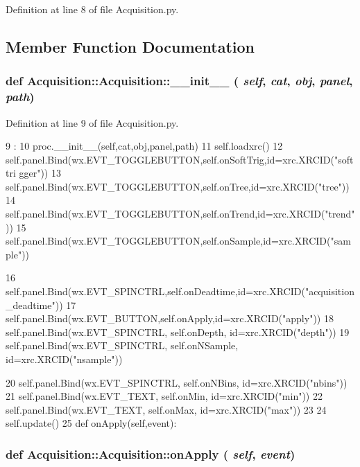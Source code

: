 Definition at line 8 of file Acquisition.py.

\subsection{Member Function Documentation}
\hypertarget{classAcquisition_1_1Acquisition_a01a30848ca3a0dd4e0e0d137b6c2b514}{
\subsubsection[{\_\-\_\-init\_\-\_\-}]{\setlength{\rightskip}{0pt plus 5cm}def Acquisition::Acquisition::\_\-\_\-init\_\-\_\- ( {\em self}, \/   {\em cat}, \/   {\em obj}, \/   {\em panel}, \/   {\em path})}}
\label{classAcquisition_1_1Acquisition_a01a30848ca3a0dd4e0e0d137b6c2b514}


Definition at line 9 of file Acquisition.py.


\begin{DoxyCode}
9                                              :
10         proc.__init__(self,cat,obj,panel,path)
11         self.loadxrc()
12         self.panel.Bind(wx.EVT_TOGGLEBUTTON,self.onSoftTrig,id=xrc.XRCID("softtri
      gger"))
13         self.panel.Bind(wx.EVT_TOGGLEBUTTON,self.onTree,id=xrc.XRCID("tree"))
14         self.panel.Bind(wx.EVT_TOGGLEBUTTON,self.onTrend,id=xrc.XRCID("trend"))
15         self.panel.Bind(wx.EVT_TOGGLEBUTTON,self.onSample,id=xrc.XRCID("sample"))
      
16         self.panel.Bind(wx.EVT_SPINCTRL,self.onDeadtime,id=xrc.XRCID("acquisition
      _deadtime"))
17         self.panel.Bind(wx.EVT_BUTTON,self.onApply,id=xrc.XRCID("apply"))
18         self.panel.Bind(wx.EVT_SPINCTRL, self.onDepth, id=xrc.XRCID("depth"))
19         self.panel.Bind(wx.EVT_SPINCTRL, self.onNSample, id=xrc.XRCID("nsample"))
      
20         self.panel.Bind(wx.EVT_SPINCTRL, self.onNBins, id=xrc.XRCID("nbins"))
21         self.panel.Bind(wx.EVT_TEXT, self.onMin, id=xrc.XRCID("min"))
22         self.panel.Bind(wx.EVT_TEXT, self.onMax, id=xrc.XRCID("max"))
23 
24         self.update()
25 
    def onApply(self,event):
\end{DoxyCode}
\hypertarget{classAcquisition_1_1Acquisition_a25a5eb642eae7543e1803ca50c38f9dc}{
\subsubsection[{onApply}]{\setlength{\rightskip}{0pt plus 5cm}def Acquisition::Acquisition::onApply ( {\em self}, \/   {\em event})}}
\label{classAcquisition_1_1Acquisition_a25a5eb642eae7543e1803ca50c38f9dc}


